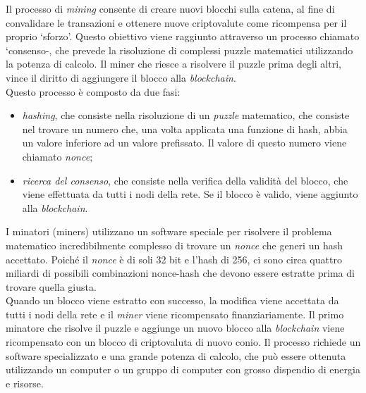Il processo di \textit{mining} consente di creare nuovi blocchi sulla catena, al fine di convalidare le transazioni e ottenere nuove criptovalute come ricompensa per il proprio `sforzo'.
Questo obiettivo viene raggiunto attraverso un processo chiamato `consenso-, che prevede la risoluzione di complessi puzzle matematici utilizzando la potenza di calcolo.
Il miner che riesce a risolvere il puzzle prima degli altri, vince il diritto di aggiungere il blocco alla \textit{blockchain}. \\

Questo processo è composto da due fasi:
\begin{itemize}
    \item \textit{hashing}, che consiste nella risoluzione di un \textit{puzzle} matematico, che consiste nel trovare un numero che, una volta applicata una funzione di hash, abbia un valore inferiore ad un valore prefissato. Il valore di questo numero viene chiamato \textit{nonce};
    \item \textit{ricerca del consenso}, che consiste nella verifica della validità del blocco, che viene effettuata da tutti i nodi della rete. Se il blocco è valido, viene aggiunto alla \textit{blockchain}.
\end{itemize}

I minatori (miners) utilizzano un software speciale per risolvere il problema matematico incredibilmente complesso 
di trovare un \textit{nonce} che generi un hash accettato. Poiché il \textit{nonce} è di soli 32 bit e l'hash di 256, ci sono circa quattro miliardi 
di possibili combinazioni nonce-hash che devono essere estratte prima di trovare quella giusta. \\

Quando un blocco viene estratto con successo, la modifica viene accettata da tutti i nodi della rete e il \textit{miner} viene ricompensato finanziariamente. 
Il primo minatore che risolve il puzzle e aggiunge un nuovo blocco alla \textit{blockchain} viene ricompensato con un blocco di criptovaluta di nuovo conio.
Il processo richiede un software specializzato e una grande potenza di calcolo, che può essere ottenuta utilizzando un computer o un gruppo di computer con grosso dispendio di energia e risorse.

